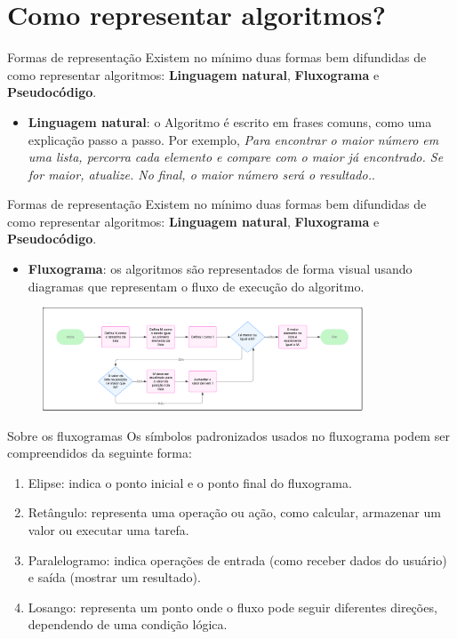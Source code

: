 \section{Como representar algoritmos?}

\begin{frame}{Formas de representação}
  Existem no mínimo duas formas bem difundidas de como representar algoritmos: \textbf{Linguagem natural}, \textbf{Fluxograma} e \textbf{Pseudocódigo}.
  \begin{itemize}
    \item \textbf{Linguagem natural}: o Algoritmo é escrito em frases comuns, como uma explicação passo a passo. Por exemplo, \textit{\color{blue}Para encontrar o maior número em uma lista, percorra cada elemento e compare com o maior já encontrado. Se for maior, atualize. No final, o maior número será o resultado.}.
  \end{itemize}
\end{frame}

\begin{frame}{Formas de representação}
  Existem no mínimo duas formas bem difundidas de como representar algoritmos: \textbf{Linguagem natural}, \textbf{Fluxograma} e \textbf{Pseudocódigo}.
  \begin{itemize}
    \item \textbf{Fluxograma}: os algoritmos são representados de forma visual usando diagramas que representam o fluxo de execução do algoritmo.
  \end{itemize}
  \begin{figure}
    \includegraphics[width=0.85\textwidth]{figuras/Fluxograma}
  \end{figure}
\end{frame}

\begin{frame}{Sobre os fluxogramas}
  Os símbolos padronizados usados no fluxograma podem ser compreendidos da seguinte forma:
  \begin{enumerate}
    \item Elipse: indica o ponto inicial e o ponto final do fluxograma.
    \item Retângulo: representa uma operação ou ação, como calcular, armazenar um valor ou executar uma tarefa.
    \item Paralelogramo: indica operações de entrada (como receber dados do usuário) e saída (mostrar um resultado).
    \item Losango: representa um ponto onde o fluxo pode seguir diferentes direções, dependendo de uma condição lógica.
  \end{enumerate}
\end{frame}

